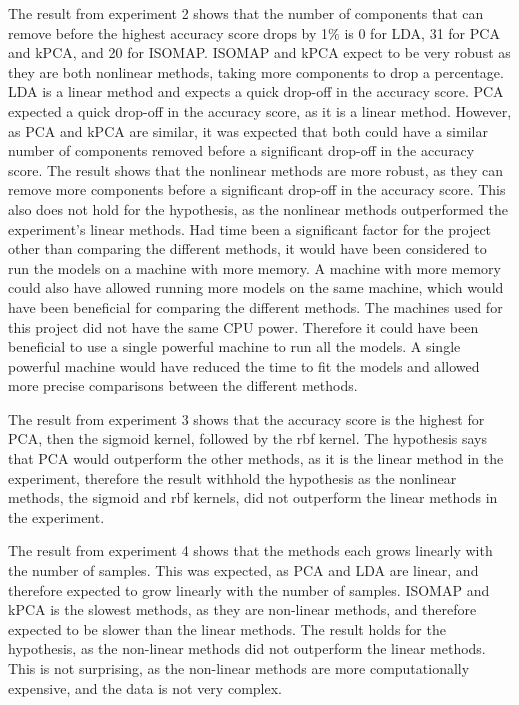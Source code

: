 The result from experiment 2 shows that the number of components that can remove before the highest accuracy score drops by 1\% is 0 for LDA, 31 for PCA and kPCA, and 20 for ISOMAP. ISOMAP and kPCA expect to be very robust as they are both nonlinear methods, taking more components to drop a percentage. LDA is a linear method and expects a quick drop-off in the accuracy score. PCA expected a quick drop-off in the accuracy score, as it is a linear method. However, as PCA and kPCA are similar, it was expected that both could have a similar number of components removed before a significant drop-off in the accuracy score. The result shows that the nonlinear methods are more robust, as they can remove more components before a significant drop-off in the accuracy score. This also does not hold for the hypothesis, as the nonlinear methods outperformed the experiment's linear methods. Had time been a significant factor for the project other than comparing the different methods, it would have been considered to run the models on a machine with more memory. A machine with more memory could also have allowed running more models on the same machine, which would have been beneficial for comparing the different methods. The machines used for this project did not have the same CPU power. Therefore it could have been beneficial to use a single powerful machine to run all the models. A single powerful machine would have reduced the time to fit the models and allowed more precise comparisons between the different methods.

The result from experiment 3 shows that the accuracy score is the highest for PCA, then the sigmoid kernel, followed by the rbf kernel. The hypothesis says that PCA would outperform the other methods, as it is the linear method in the experiment, therefore the result withhold the hypothesis as the nonlinear methods, the sigmoid and rbf kernels, did not outperform the linear methods in the experiment. 

The result from experiment 4 shows that the methods each grows linearly with the number of samples. This was expected, as PCA and LDA are linear, and therefore expected to grow linearly with the number of samples. ISOMAP and kPCA is the slowest methods, as they are non-linear methods, and therefore expected to be slower than the linear methods. The result holds for the hypothesis, as the non-linear methods did not outperform the linear methods. This is not surprising, as the non-linear methods are more computationally expensive, and the data is not very complex.

